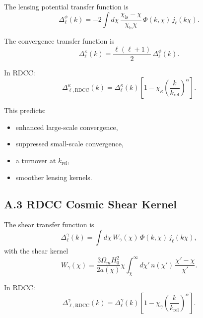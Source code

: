\documentclass[11pt,a4paper]{article}
\begin{document}
The lensing potential transfer function is
\begin{equation}
    \Delta_{\ell}^{\phi}(k)
    = -2 \int d\chi\,
      \frac{\chi_{\mathrm{ls}}-\chi}{\chi_{\mathrm{ls}}\chi}\,
      \Phi(k,\chi)\,
      j_{\ell}(k\chi).
\end{equation}

The convergence transfer function is
\begin{equation}
    \Delta_{\ell}^{\kappa}(k)
    = \frac{\ell(\ell+1)}{2}\,
      \Delta_{\ell}^{\phi}(k).
\end{equation}

In RDCC:
\begin{equation}
    \Delta_{\ell,\mathrm{RDCC}}^{\kappa}(k)
    = \Delta_{\ell}^{\kappa}(k)
      \left[
        1 - \chi_{\kappa}
        \left(\frac{k}{k_{\mathrm{rel}}}\right)^{\alpha}
      \right].
\end{equation}

This predicts:

\begin{itemize}
    \item enhanced large-scale convergence,
    \item suppressed small-scale convergence,
    \item a turnover at $k_{\mathrm{rel}}$,
    \item smoother lensing kernels.
\end{itemize}

\subsection*{A.3 RDCC Cosmic Shear Kernel}

The shear transfer function is
\begin{equation}
    \Delta_{\ell}^{\gamma}(k)
    = \int d\chi\,
      W_{\gamma}(\chi)\,
      \Phi(k,\chi)\,
      j_{\ell}(k\chi),
\end{equation}
with the shear kernel
\begin{equation}
    W_{\gamma}(\chi)
    = \frac{3\Omega_{m}H_{0}^{2}}{2a(\chi)}
      \chi
      \int_{\chi}^{\infty} d\chi'\,
      n(\chi')\,
      \frac{\chi' - \chi}{\chi'}.
\end{equation}

In RDCC:
\begin{equation}
    \Delta_{\ell,\mathrm{RDCC}}^{\gamma}(k)
    = \Delta_{\ell}^{\gamma}(k)
      \left[
        1 - \chi_{\gamma}
        \left(\frac{k}{k_{\mathrm{rel}}}\right)^{\alpha}
      \right].
\end{equation}
\end{document}
